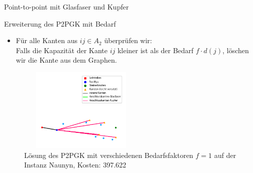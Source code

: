 \documentclass{beamer}
\begin{document}
	\begin{frame}{Point-to-point mit Glasfaser und Kupfer}
	\end{frame}
	
	\begin{frame}{Erweiterung des P2PGK mit Bedarf}
		\begin{itemize}
			\item F\"ur alle Kanten aus $ij \in A_2$ \"uberpr\"ufen wir:\\
			Falls die Kapazit\"at der Kante $ij$ kleiner ist als der Bedarf  $f \cdot d(j)$,
			l\"oschen wir die Kante aus dem Graphen.
		\end{itemize}
\begin{figure}[h]
	\centering
		\includegraphics[height=4cm, width=6cm]{./Bilder/P2PGK_Naunyn_demand1_duration0}
	\caption{Lösung des P2PGK mit verschiedenen Bedarfsfaktoren $f = 1$ auf der Instanz Naunyn, Kosten: 397.622}
\end{figure}
	\end{frame}
	
\end{document}
